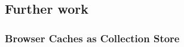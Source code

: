 \documentclass[11pt,a4paper,headsepline,twoside]{scrartcl}		%
\begin{document}









\subsection{Further work}
\label{sec:further-work}



\subsubsection{Browser Caches as Collection Store}
\label{sec:browser-caches-as}
\end{document}
